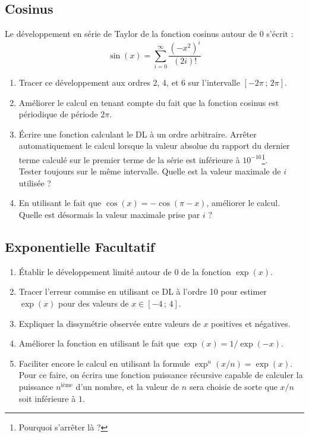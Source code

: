 \subsection{Cosinus}
Le développement en  série de Taylor de la fonction  cosinus autour de
$0$ s'écrit :
\begin{equation}
\sin(x) = \sum_{i=0}^\infty \frac{(-x^{2})^i}{(2i)!}
\end{equation}
\begin{enumerate}
\item Tracer ce  développement aux ordres 2, 4, et  6 sur l'intervalle
  $[-2\pi\,;\,2\pi]$.
\item Améliorer  le calcul en  tenant compte  du fait que  la fonction
  cosinus est périodique de période $2\pi$.
\item  Écrire une  fonction calculant  le  DL à  un ordre  arbitraire.
  Arrêter  automatiquement  le calcul  lorsque  la  valeur absolue  du
  rapport du  dernier terme calculé sur  le premier terme de  la série
  est  inférieure   à  $10^{-16}$\footnote{Pourquoi s'arrêter là ?}.\\  Tester  toujours   sur  le  même
  intervalle. Quelle est la valeur maximale de $i$ utilisée ?
\item En utilisant le fait  que $\cos(x) = -\cos(\pi-x)$, améliorer le
  calcul. Quelle est désormais la valeur maximale prise par $i$ ?
 \end{enumerate}


\subsection{Exponentielle {\sc Facultatif}}
\begin{enumerate}
\item  Établir le  développement limité  autour  de 0  de la  fonction
  $\exp(x)$.
\item Tracer  l'erreur commise en  utilisant ce  DL à l'ordre  10 pour
  estimer $\exp(x)$ pour des valeurs de $x \in [-4\,;\,4]$.
\item Expliquer la dissymétrie observée entre valeurs de $x$ positives
  et négatives.
\item  Améliorer la  fonction  en  utilisant le  fait  que $\exp(x)  =
  1/\exp(-x)$.
\item Faciliter encore le calcul  en utilisant la formule $\exp^n(x/n)
  =  \exp(x)$.   Pour  ce  faire, on  écrira  une  fonction  puissance
  récursive   capable  de  calculer   la  puissance
  $n^\textrm{ième}$ d'un nombre,  et la valeur de $n$  sera choisie de
  sorte que $x/n$ soit inférieure à $1$.\\

\end{enumerate}

